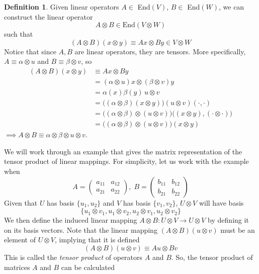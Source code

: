 \documentclass{article}
\theoremstyle{remark}
\theoremstyle{definition}
\newtheorem{definition}{Definition}[section]
\begin{document}
    \begin{definition}
    Given linear operators $A \in $ End$(V)$, $B \in $ End$(W)$, we can construct the linear operator 
    \[A \otimes B \in \text{End}(V \otimes W)\] 
    such that 
    \[(A \otimes B) (x \otimes y) \equiv A x \otimes B y \in V \otimes W\]
    Notice that since $A, B$ are linear operators, they are tensors. More specifically, $A \equiv \alpha \otimes u$ and $B \equiv \beta \otimes v$, so
    \begin{align*}
        (A \otimes B) (x \otimes y) & \equiv A x \otimes B y \\
        & = (\alpha \otimes u) x \otimes (\beta \otimes v) y \\
        & = \alpha (x) \beta (y) \, u \otimes v \\
        & = \big((\alpha \otimes \beta)(x \otimes y)\big) (u \otimes v)(\cdot, \cdot) \\
        & = \big((\alpha \otimes \beta) \otimes (u \otimes v)\big) \big((x \otimes y), (\cdot \otimes \cdot)\big) \\
        & = \big((\alpha \otimes \beta) \otimes (u \otimes v)\big)(x \otimes y) 
    \end{align*}
    $\implies A \otimes B \equiv \alpha \otimes \beta \otimes u \otimes v$. 
    \end{definition}
    We will work through an example that gives the matrix representation of the tensor product of linear mappings. For simplicity, let us work with the example when 
    \[A = \begin{pmatrix}
    a_{11} & a_{12} \\ a_{21} & a_{22}
    \end{pmatrix}, \; B = \begin{pmatrix}
    b_{11} & b_{12} \\ b_{21} & b_{22}
    \end{pmatrix}\]
    Given that $U$ has basis $\{u_1, u_2\}$ and $V$ has basis $\{v_1, v_2\}$, $U \otimes V$ will have basis 
    \[\{u_1 \otimes v_1, u_1 \otimes v_2, u_2 \otimes v_1, u_2 \otimes v_2\}\]
    We then define the induced linear mapping $A\otimes B: U \otimes V \longrightarrow U \otimes V$ by defining it on its basis vectors. Note that the linear mapping $(A \otimes B)(u\otimes v)$ must be an element of $U \otimes V$, implying that it is defined
    \[(A \otimes B)(u\otimes v) \equiv Au \otimes Bv\]
    This is called the \textit{tensor product} of operators $A$ and $B$.
    So, the tensor product of matrices $A$ and $B$ can be calculated
\end{document}
